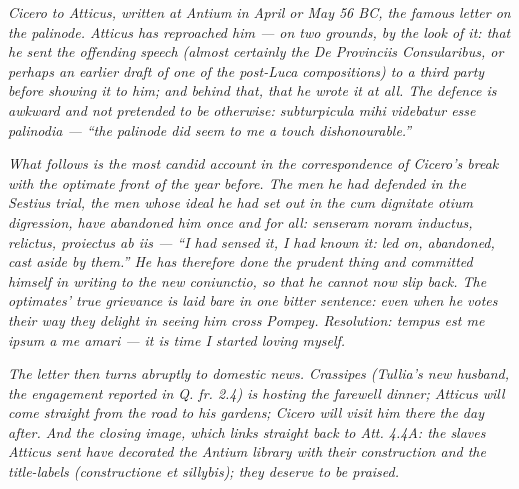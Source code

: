 
\textit{Cicero to Atticus, written at Antium in April or May
56 BC, the famous letter on the palinode. Atticus has
reproached him --- on two grounds, by the look of it: that he
sent the offending speech (almost certainly the
\textit{De Provinciis Consularibus}, or perhaps an earlier draft
of one of the post-Luca compositions) to a third party before
showing it to him; and behind that, that he wrote it at all.
The defence is awkward and not pretended to be otherwise:
\textit{subturpicula mihi videbatur esse palinodia} ---
``the palinode did seem to me a touch dishonourable.''}

\textit{What follows is the most candid account in the
correspondence of Cicero's break with the optimate front of
the year before. The men he had defended in the Sestius
trial, the men whose ideal he had set out in the
\textit{cum dignitate otium} digression, have abandoned him
once and for all: \textit{senseram noram inductus, relictus,
proiectus ab iis} --- ``I had sensed it, I had known it: led
on, abandoned, cast aside by them.'' He has therefore done
the prudent thing and committed himself in writing to the
new coniunctio, so that he cannot now slip back. The
optimates' true grievance is laid bare in one bitter
sentence: even when he votes their way they delight in
seeing him cross Pompey. Resolution: \textit{tempus est me
ipsum a me amari} --- it is time I started loving myself.}

\textit{The letter then turns abruptly to domestic news.
Crassipes (Tullia's new husband, the engagement reported in
\textit{Q. fr.} 2.4) is hosting the farewell dinner; Atticus
will come straight from the road to his gardens; Cicero will
visit him there the day after. And the closing image, which
links straight back to \textit{Att.} 4.4A: the slaves Atticus
sent have decorated the Antium library with their construction
and the title-labels (\textit{constructione et sillybis}); they
deserve to be praised.}
